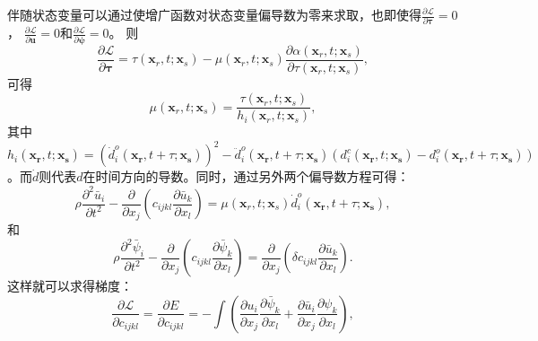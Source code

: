 伴随状态变量可以通过使增广函数对状态变量偏导数为零来求取，也即使得$\frac{\partial \mathcal{L}}{\partial \mathbf{\tau}}=0$，
$\frac{\partial \mathcal{L}}{\partial \mathbf{u}}=0$和$\frac{\partial \mathcal{L}}{\partial \mathbf{\psi}}=0$。
则
\begin{equation}
	\frac{\partial \mathcal{L}}{\partial \mathbf{\tau}}=\tau(\mathbf{x}_r,t;\mathbf{x}_s)
	-\mu(\mathbf{x}_r,t;\mathbf{x}_s)\frac{\partial \alpha(\mathbf{x}_r,t;\mathbf{x}_s)}{\partial \tau(\mathbf{x}_r,t;\mathbf{x}_s)},
        \label{eq:PartialTau}
\end{equation}
可得
\begin{equation}
	\mu(\mathbf{x}_r,t;\mathbf{x}_s)=\frac{\tau(\mathbf{x}_r,t;\mathbf{x}_s)}{ h_i(\mathbf{x}_r,t;\mathbf{x}_s)},
        \label{eq:AdjointTau}
\end{equation}
其中$h_i(\mathbf{x_r},t;\mathbf{x_s})=(\dot{d}^o_i(\mathbf{x_r},t+\tau;\mathbf{x_s}))^2-\ddot{d}^o_i(\mathbf{x_r},t+\tau;\mathbf{x_s})
(d^c_i(\mathbf{x_r},t;\mathbf{x_s})-d^o_i(\mathbf{x_r},t+\tau;\mathbf{x_s}))$。而$\dot{d}$则代表$d$在时间方向的导数。同时，通过另外两个偏导数方程可得：
\begin{equation}
	\rho\frac{\partial^2 \bar{u}_i }{\partial t^2}
	-\frac{\partial}{\partial x_j}(c_{ijkl}\frac{\partial \bar{u}_k}{\partial x_l})=\mu(\mathbf{x}_r,t;\mathbf{x}_s)
	\dot{d}^o_i(\mathbf{x_r},t+\tau;\mathbf{x_s}),
        \label{eq:PartialU}
\end{equation}
和
\begin{equation}
	\rho\frac{\partial^2 \bar{\psi}_i }{\partial t^2}
	-\frac{\partial}{\partial x_j}(c_{ijkl}\frac{\partial \bar{\psi}_k}{\partial x_l})=
	\frac{\partial}{\partial x_j}(\delta c_{ijkl}\frac{\partial \bar{u}_k}{\partial x_l}).
        \label{eq:PartialPsi}
\end{equation}
这样就可以求得梯度：
\begin{equation}
	\frac{\partial \mathcal{L}}{\partial c_{ijkl}}=
    \frac{\partial E}{\partial c_{ijkl}}=-\int (\frac{\partial u_{i}}{\partial
    x_j}\frac{\partial \bar{\psi}_{k}}{\partial x_l}+\frac{\partial \bar{u}_{i}}{\partial
    x_j}\frac{\partial \psi_{k}}{\partial x_l}),
    \label{eq:GradientCijkl1}
\end{equation}

